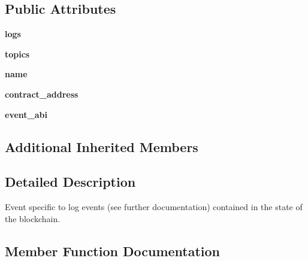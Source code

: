 \subsection*{Public Attributes}
\begin{DoxyCompactItemize}
\item 
\mbox{\label{classapp_1_1models_1_1events_1_1_log_event_a3868f4639083433f0b9f99214ade1c1e}} 
{\bfseries logs}
\item 
\mbox{\label{classapp_1_1models_1_1events_1_1_log_event_a9de37620958f6e3db9b2c78f05269738}} 
{\bfseries topics}
\item 
\mbox{\label{classapp_1_1models_1_1events_1_1_log_event_a7a51f6b7f14c3f5e59a903a4e689d621}} 
{\bfseries name}
\item 
\mbox{\label{classapp_1_1models_1_1events_1_1_log_event_a99a8938e34aecd0c8a59516c0e67a6cb}} 
{\bfseries contract\+\_\+address}
\item 
\mbox{\label{classapp_1_1models_1_1events_1_1_log_event_a666f5f498564f077a0a704957b8e1c4e}} 
{\bfseries event\+\_\+abi}
\end{DoxyCompactItemize}
\subsection*{Additional Inherited Members}


\subsection{Detailed Description}
\begin{DoxyVerb}Event specific to log events (see further documentation) contained in the state of the blockchain.
\end{DoxyVerb}
 

\subsection{Member Function Documentation}
\mbox{\label{classapp_1_1models_1_1events_1_1_log_event_aa6ef2fc83a7537e2f286147deb948544}} 
